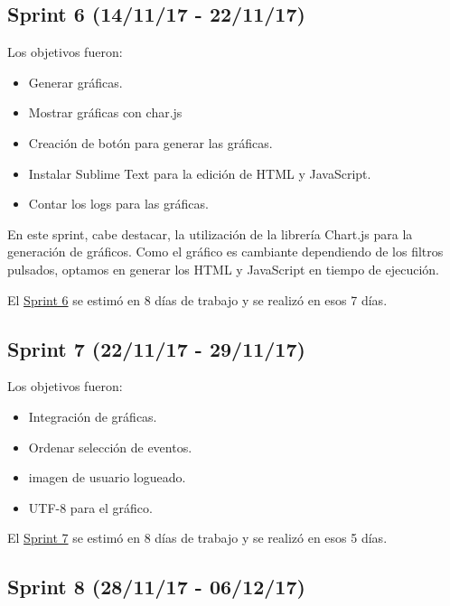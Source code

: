 \subsection{Sprint 6 (14/11/17 -
	22/11/17)}\label{sprint-6-141117---221117}

Los objetivos fueron:
\begin{itemize}
	\tightlist
	\item
	Generar gráficas.
	\item
	Mostrar gráficas con char.js \cite{javascript:chart}
	\item
	Creación de botón para generar las gráficas.	
	\item
	Instalar Sublime Text para la edición de HTML y JavaScript.
	\item
	Contar los logs para las gráficas.
	
\end{itemize}

En este sprint, cabe destacar, la utilización de la librería Chart.js para la generación de gráficos. Como el gráfico es cambiante dependiendo de los filtros pulsados, optamos en generar los HTML y JavaScript en tiempo de ejecución.

El \href{https://github.com/trona85/GII-17.1B-UBULog-1.0/milestone/6?closed=1}{Sprint 6} se estimó en 8 días de trabajo y se realizó en esos 7 días.


\subsection{Sprint 7 (22/11/17 -
	29/11/17)}\label{sprint-7-221117---291117}

Los objetivos fueron:
\begin{itemize}
	\tightlist
	\item
	Integración de gráficas.
	\item
	Ordenar selección de eventos.
	\item
	imagen de usuario logueado.	
	\item
	UTF-8 para el gráfico.
	
\end{itemize}

El \href{https://github.com/trona85/GII-17.1B-UBULog-1.0/milestone/7?closed=1}{Sprint 7} se estimó en 8 días de trabajo y se realizó en esos 5 días.


\subsection{Sprint 8 (28/11/17 -
	06/12/17)}\label{sprint-8-281117---061217}

